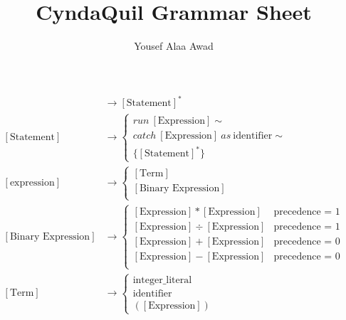 \documentclass[12pt, letterpaper]{article}
\title{CyndaQuil Grammar Sheet}
\author{Yousef Alaa Awad}
\begin{document}
\maketitle
\begin{align}
  [\text{Program}] &\to [\text{Statement}]^* \\
  [\text{Statement}] &\to \begin{cases}
    run\ [\text{Expression}]\sim \\
    catch\  [\text{Expression}]\ as\ \text{identifier}\sim \\
    \{[\text{Statement}]^*\}
  \end{cases} \\
  [\text{expression}]&\to \begin{cases}
    [\text{Term}] \\
    [\text{Binary Expression}] \\
  \end{cases} \\
  [\text{Binary Expression}] &\to \begin{cases}
    [\text{Expression}] * [\text{Expression}] & \text{precedence = 1}\\
    [\text{Expression}] \div [\text{Expression}] & \text{precedence = 1}\\
    [\text{Expression}] + [\text{Expression}] &  \text{precedence = 0}\\
    [\text{Expression}] - [\text{Expression}] &  \text{precedence = 0}\\
  \end{cases} \\
  [\text{Term}] &\to \begin{cases}
  \text{integer\_literal} \\
  \text{identifier} \\
    ([\text{Expression}])
  \end{cases}
\end{align}
\end{document}
